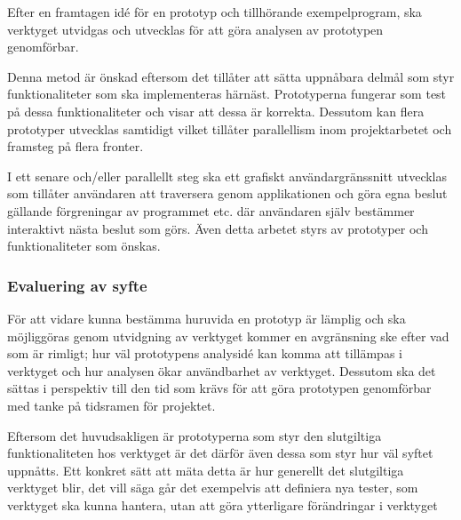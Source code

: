 Efter en framtagen id\'e för en prototyp och tillhörande exempelprogram, ska
verktyget utvidgas och utvecklas för att göra analysen av prototypen genomförbar.

Denna metod är önskad eftersom det tillåter att sätta uppnåbara delmål som styr
funktionaliteter som ska implementeras härnäst. Prototyperna fungerar som test på dessa
funktionaliteter och visar att dessa är korrekta. Dessutom kan flera prototyper 
utvecklas samtidigt vilket tillåter parallellism inom projektarbetet och
framsteg på flera fronter.

I ett senare och/eller parallellt steg ska ett grafiskt användargränssnitt
utvecklas som tillåter användaren att traversera genom applikationen och göra
egna beslut gällande förgreningar av programmet etc. där användaren själv
bestämmer interaktivt nästa beslut som görs. Även detta arbetet styrs av
prototyper och funktionaliteter som önskas.

\subsubsection{Evaluering av syfte}

För att vidare kunna bestämma huruvida en prototyp är lämplig och ska möjliggöras
genom utvidgning av verktyget kommer en avgränsning ske efter vad som är rimligt;
hur väl prototypens analysidé kan komma att tillämpas i verktyget och hur analysen
ökar användbarhet av verktyget. Dessutom ska det sättas i perspektiv till den tid
som krävs för att göra prototypen genomförbar med tanke på tidsramen för projektet.

Eftersom det huvudsakligen är prototyperna som styr den slutgiltiga
funktionaliteten hos verktyget är det därför även dessa som styr hur väl syftet
uppnåtts. Ett konkret sätt att mäta detta är hur generellt det slutgiltiga
verktyget blir, det vill säga går det exempelvis att definiera nya tester, som verktyget
ska kunna hantera, utan att göra ytterligare förändringar i verktyget 




%

